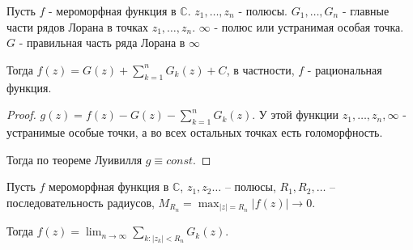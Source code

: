 \begin{theorem}

    Пусть $f$ - мероморфная функция в $\mathbb{C}$. $z_1, \ldots, z_n$ - полюсы.
    $G_1, \ldots, G_n$ - главные части рядов Лорана в точках $z_1, \ldots, z_n$.
    $\infty$ - полюс или устранимая особая точка. $G$ - правильная часть
    ряда Лорана в $\infty$

    Тогда $f(z) = G(z) + \sum_{k = 1}^n G_k(z) + C$, в частности,
    $f$ - рациональная функция.
\end{theorem}

\begin{proof}
    $g(z) = f(z) - G(z) - \sum_{k = 1}^n G_k(z)$. У этой функции $z_1, \ldots, z_n, \infty$ -
    устранимые особые точки, а во всех остальных точках есть голоморфность.

    Тогда по теореме Луивилля $g \equiv const$.
\end{proof}

\begin{theorem}
    Пусть $f$ мероморфная функция в $\mathbb{C}$, $z_1, z_2 \ldots$ -- полюсы,
    $R_1, R_2, \ldots$ -- последовательность радиусов, $M_{R_n} = \max_{|z| = R_n} |f(z)| \rightarrow 0$.

    Тогда $f(z) = \lim_{n \to \infty} \sum_{k:|z_k| < R_n} G_k (z)$.
\end{theorem}

